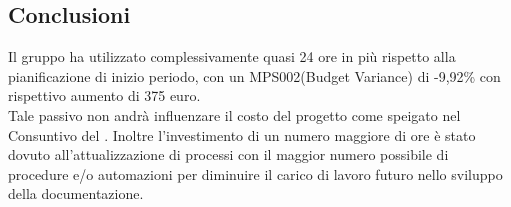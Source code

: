 \documentclass[PianoDiQualifica.tex]{subfiles}
\begin{document}
\subsection{Conclusioni}
Il gruppo ha utilizzato complessivamente quasi 24 ore in più rispetto alla pianificazione di inizio periodo, con un MPS002(Budget Variance) di -9,92\% con rispettivo aumento di 375 euro.\\
Tale passivo non andrà influenzare il costo del progetto come speigato nel Consuntivo del \pdp{}.
Inoltre l'investimento di un numero maggiore di ore è stato dovuto all'attualizzazione di processi con il maggior numero possibile di procedure e/o automazioni per diminuire il carico di lavoro futuro nello sviluppo della documentazione.

	


\end{document}
